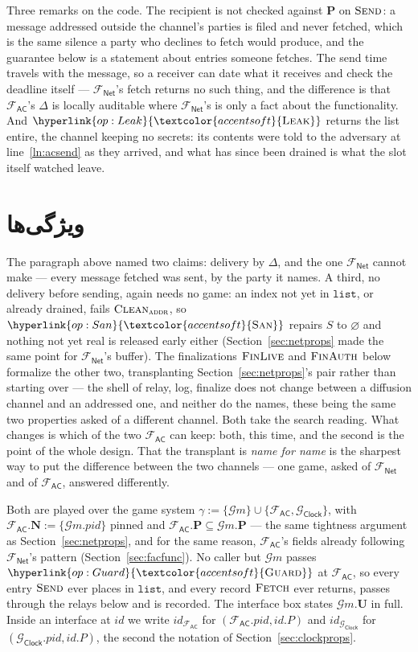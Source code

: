 \documentclass[10pt,oneside,openany]{book}
\newcommand{\Ps}{\mathbf{P}}
\newcommand{\PID}{\mathit{pid}}
\renewcommand{\emptyset}{\varnothing}
\newcommand{\admits}{\mathbf{N}}
\newcommand{\uses}{\mathbf{U}}
\newcommand{\op}[1]{\textnormal{\textsc{#1}}}
\newcommand{\opl}[1]{\hyperlink{op:#1}{\textcolor{accentsoft}{\op{#1}}}}
\newcommand{\id}{id}
\newcommand{\Gm}{\mathcal{G}m}
\newcommand{\Gclock}{\mathcal{G}_{\mathsf{Clock}}}
\newcommand{\Fnet}{\mathcal{F}_{\mathsf{Net}}}
\newcommand{\Fac}{\mathcal{F}_{\mathsf{AC}}}
\newcommand{\San}{\opl{San}}
\newcommand{\Clean}{\op{Clean}}
\newcommand{\V}[1]{\mathtt{#1}}
\theoremstyle{accentdef}
\theoremstyle{accentplain}
\begin{document}
Three remarks on the code. The recipient is not checked against $\Ps$ on $\op{Send}$: a message
addressed outside the channel's parties is filed and never fetched, which is the same silence a
party who declines to fetch would produce, and the guarantee below is a statement about entries
someone fetches. The send time travels with the message, so a receiver can date what it receives
and check the deadline itself --- $\Fnet$'s fetch returns no such thing, and the difference is
that $\Fac$'s $\Delta$ is locally auditable where $\Fnet$'s is only a fact about the
functionality. And $\opl{Leak}$ returns the list entire, the channel keeping no secrets: its
contents were told to the adversary at line~\ref{ln:acsend} as they arrived, and what has since
been drained is what the slot itself watched leave.

\section{ویژگی‌ها}\label{sec:facprops}

The paragraph above named two claims: delivery by $\Delta$, and the one $\Fnet$ cannot make ---
every message fetched was sent, by the party it names. A third, no delivery before sending, again
needs no game: an index not yet in $\V{list}$, or already drained, fails $\Clean_{\op{addr}}$, so
$\San$ repairs $S$ to $\emptyset$ and nothing not yet real is released early either
(Section~\ref{sec:netprops} made the same point for $\Fnet$'s buffer). The finalizations $\op{FinLive}$ and
$\op{FinAuth}$ below formalize the other two, transplanting Section~\ref{sec:netprops}'s pair
rather than starting over --- the shell of relay, log, finalize does not change between a diffusion
channel and an addressed one, and neither do the names, these being the same two properties asked
of a different channel. Both take the search reading. What changes is which of the two $\Fac$ can
keep: both, this time, and the second is the point of the whole design. That the transplant is
\emph{name for name} is the sharpest way to put the difference between the two channels --- one
game, asked of $\Fnet$ and of $\Fac$, answered differently.

Both are played over the game system $\gamma := \{\Gm\} \cup \{\Fac,\Gclock\}$, with
$\Fac.\admits := \{\Gm.\PID\}$ pinned and $\Fac.\Ps \subseteq \Gm.\Ps$ --- the same tightness
argument as Section~\ref{sec:netprops}, and for the same reason, $\Fac$'s fields already
following $\Fnet$'s pattern (Section~\ref{sec:facfunc}). No caller but $\Gm$ passes $\opl{Guard}$
at $\Fac$, so every entry $\op{Send}$ ever places in $\V{list}$, and every record $\op{Fetch}$
ever returns, passes through the relays below and is recorded. The interface box states
$\Gm.\uses$ in full. Inside an interface at $\id$ we write $\id_{\Fac}$ for $(\Fac.\PID,\id.P)$
and $\id_{\Gclock}$ for $(\Gclock.\PID,\id.P)$, the second the notation of
Section~\ref{sec:clockprops}.
\end{document}

